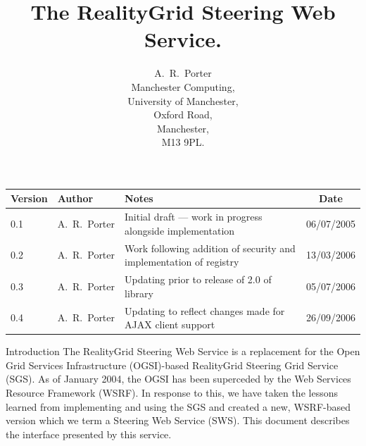 \documentclass[a4paper]{article}
\begin{document}
\title{The RealityGrid Steering Web Service.}

\author{A.~R.~Porter \\
Manchester Computing,\\University of Manchester,\\Oxford Road,\\
Manchester,\\M13 9PL.}


\maketitle

\begin{table}
\begin{center}
\begin{tabular}{l|l|p{5cm}|c}
\hline\hline
Version & Author & Notes & Date \\
\hline
0.1 & A.~R.~Porter & Initial draft --- work in progress alongside implementation & 06/07/2005\\
0.2 & A.~R.~Porter & Work following addition of security and implementation of registry & 13/03/2006\\
0.3 & A.~R.~Porter & Updating prior to release of 2.0 of library & 05/07/2006\\
0.4 & A.~R.~Porter & Updating to reflect changes made for AJAX client support & 26/09/2006\\
\hline\hline
\end{tabular}
\end{center}
\end{table}

\pagebreak

\tableofcontents

\pagebreak

\begin{section}{Introduction}
The RealityGrid Steering Web Service is a replacement for the Open
Grid Services Infrastructure (OGSI)-based RealityGrid Steering Grid
Service (SGS).  As of January 2004, the OGSI has been superceded by
the Web Services Resource Framework (WSRF).  In response to this, we
have taken the lessons learned from implementing and using the SGS and
created a new, WSRF-based version which we term a Steering Web Service
(SWS).  This document describes the interface presented by this
service.
\end{section}
\end{document}
